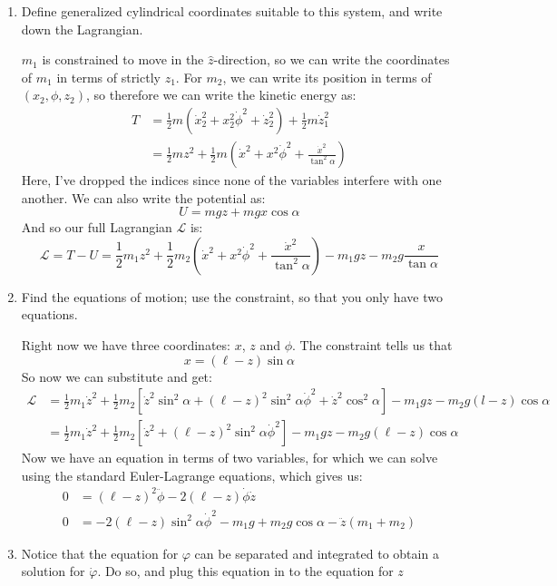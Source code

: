 \documentclass[10pt]{article}
\begin{document}
	\begin{enumerate}[label=\alph*)]
			\item Define generalized cylindrical coordinates suitable to this system, and write down the 
					Lagrangian.

					\begin{solution}
						$m_1$ is constrained to move in the $\hat{z}$-direction, so we can write the coordinates
						of $m_1$ in terms of strictly $z_1$. For $m_2$, we can write its position in terms of 
						$(x_2, \phi, z_2)$, so therefore we can write the kinetic energy as:
						\begin{align*}
								T &= \frac 12 m (\dot x_2^2 + x_2^2 \dot \phi^2 + \dot z_2^2) + 
						\frac 12 m\dot z_1^2\\
								  &= \frac 12 m z^2 + \frac 12 m \left(\dot x^2 + x^2 \dot \phi^2 + 
								  \frac{\dot x^2}{\tan^2\alpha}\right)
						\end{align*}
						Here, I've dropped the indices since none of the variables interfere with one another.
						We can also write the potential as:
						\[ U = mgz + mgx\cos \alpha\]
						And so our full Lagrangian $\mathcal L$ is:
						\[ \mathcal L = T - U = \frac 12 m_1 z^2 
								+ \frac 12 m_2 \left(\dot x^2 + x^2 \dot \phi^2 + 
						\frac{\dot x^2}{\tan^2\alpha}\right) - m_1gz - m_2g \frac{x}{\tan \alpha}\]
					\end{solution}
			\item Find the equations of motion; use the constraint, so that you only have two equations.

				\begin{solution}
						Right now we have three coordinates: $x$, $z$ and $\phi$. The constraint tells us that 
						\[ x = (\ell-z)\sin \alpha\]
						So now we can substitute and get:
						\begin{align*}
								\mathcal L &= \frac{1}{2}m_1\dot z^2 + 
								\frac{1}{2}m_2 \left[\dot z^2 \sin^2 \alpha
								+ (\ell-z)^2\sin^2 \alpha \dot \phi^2 + \dot z^2 \cos^2\alpha\right]
								- m_1gz - m_2g(l-z)\cos \alpha\\
										   &= \frac{1}{2}m_1\dot z^2 + \frac{1}{2}m_2\left[\dot z^2 +
										   (\ell-z)^2 \sin^2 \alpha \dot \phi^2\right] - m_1gz - 
										   m_2g(\ell-z)\cos \alpha
						\end{align*}
						Now we have an equation in terms of two variables, for which we can solve using 
						the standard Euler-Lagrange equations, which gives us:
						\begin{align*}
								0 &= (\ell- z)^2\ddot \phi - 2(\ell- z)\dot \phi \dot z\\
								0 &= -2(\ell-z)\sin^2\alpha \dot \phi^2 - m_1g+m_2g\cos \alpha - 
								\ddot z(m_1 +m_2)
						\end{align*}
				\end{solution}
		 	\item Notice that the equation for $\varphi$ can be separated and integrated to obtain a solution for
					$\dot \varphi$. Do so, and plug this equation in to the equation for $z$


\end{enumerate}
\end{document}
